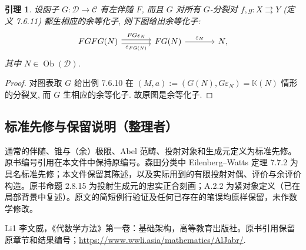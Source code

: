 \documentclass[11pt]{article}
\newcommand{\Obj}{\operatorname{Ob}}
\newcommand{\CorpusNumber}{0}
\newtheorem{lemma}[theorem]{引理}
\theoremstyle{definition}
\begin{document}
\def\CorpusNumber{7.6.13}
\begin{lemma}\label{prop:Beck-FG-coeq}
	设函子 $G: \mathcal{D} \to \mathcal{C}$ 有左伴随 $F$, 而且 $G$ 对所有 $G$-分裂对 $f, g: X \rightrightarrows Y$ (定义 7.6.11) 都生相应的余等化子, 则下图给出余等化子:
	\begin{equation*}\begin{tikzcd}[column sep=large]
		FGFG(N) \arrow[shift left, r, "FG\varepsilon_N"] \arrow[shift right, r, "\varepsilon_{FG(N)}"'] & FG(N) \arrow[r, "\varepsilon_N"] & N,
	\end{tikzcd}\end{equation*}
	其中 $N \in \Obj(\mathcal{D})$.
\end{lemma}
\begin{proof}
	对图表取 $G$ 给出例 7.6.10 在 $(M, a) := (G(N), G\varepsilon_N) = \mathbb{K}(N)$ 情形的分裂叉, 而 $G$ 生相应的余等化子. 故原图是余等化子.
\end{proof}
\subsection*{标准先修与保留说明（整理者）}
通常的伴随、锥与（余）极限、Abel 范畴、投射对象和生成元定义为标准先修。原书编号引用在本文件中保持原编号。森田分类中 Eilenberg--Watts 定理 7.7.2 为具名标准先修；本文件保留其陈述，以及实际用到的有限投射对偶、评价与余评价构造。原书命题 2.8.15 为投射生成元的忠实正合刻画；A.2.2 为紧对象定义（已在局部背景中复述）。原文的简短例行验证及任何已存在的笔误均原样保留，未作数学修改。
\begin{thebibliography}{Li1}
 李文威，《代数学方法》第一卷：基础架构，高等教育出版社。原书引用保留原章节和结果编号；\url{https://www.wwli.asia/mathematics/AlJabr/}.
\end{thebibliography}
\end{document}
